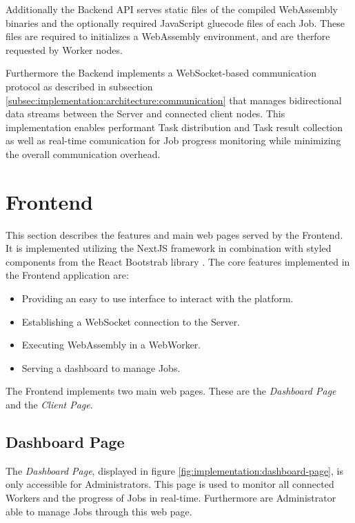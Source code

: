 Additionally the Backend \ac{API} serves static files of the compiled WebAssembly binaries and the optionally required JavaScript gluecode files of each Job. These files are required to initializes a WebAssembly environment, and are therfore requested by Worker nodes.

Furthermore the Backend implements a WebSocket-based communication protocol as described in subsection \ref{subsec:implementation:architecture:communication} that manages bidirectional data streams between the Server and connected client nodes. This implementation enables performant Task distribution and Task result collection as well as real-time comunication for Job progress monitoring while minimizing the overall communication overhead.

\section{Frontend}
\label{sec:implementation:frontend}
This section describes the features and main web pages served by the Frontend. It is implemented utilizing the NextJS framework in combination with styled components from the React Bootstrab library \cite{implementation:bootstrap}. The core features implemented in the Frontend application are:

\begin{itemize}
    \item Providing an easy to use interface to interact with the platform.
    \item Establishing a WebSocket connection to the Server.
    \item Executing WebAssembly in a WebWorker.
    \item Serving a dashboard to manage Jobs.
\end{itemize}

The Frontend implements two main web pages. These are the \emph{Dashboard Page} and the \emph{Client Page}.

\subsection{Dashboard Page}
\label{subsec:implementation:dashboard-page}

The \emph{Dashboard Page}, displayed in figure \ref{fig:implementation:dashboard-page}, is only accessible for Administrators. This page is used to monitor all connected Workers and the progress of Jobs in real-time. Furthermore are Administrator able to manage Jobs through this web page.

